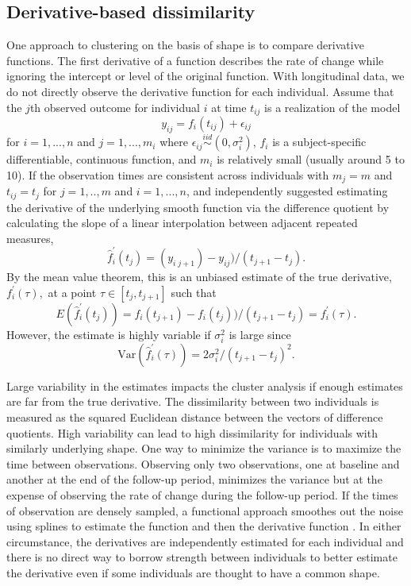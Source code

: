 \subsection{Derivative-based dissimilarity}
One approach to clustering on the basis of shape is to compare derivative functions. The first derivative of a function describes the rate of change while ignoring the intercept or level of the original function. With longitudinal data, we do not directly observe the derivative function for each individual. Assume that the $j$th observed outcome for individual $i$ at time $t_{ij}$ is a realization of the model
$$y_{ij}= f_i(t_{ij})+\epsilon_{ij}$$
for $i=1,...,n$ and $j=1,...,m_{i}$ where $\epsilon_{ij}\overset{iid}{\sim} (0,\sigma_{i}^{2})$, $f_{i}$ is a subject-specific differentiable, continuous function, and $m_{i}$ is relatively small (usually around 5 to 10). If the observation times are consistent across individuals with $m_{j}=m$ and $t_{ij} = t_{j}$ for $j=1,..,m$ and $i=1,...,n$, \Textcite{moller2003} and \textcite{d2000} independently suggested estimating the derivative of the underlying smooth function via the difference quotient by calculating the slope of a linear interpolation between adjacent repeated measures,
$$\hat{f}_{i}^{'}(t_{j}) = (y_{i\;j+1})-y_{ij})/(t_{j+1}-t_j).$$
By the mean value theorem, this is an unbiased estimate of the true derivative, $f_{i}^{'}(\tau),$ at a point $\tau\in[t_{j},t_{j+1}]$ such that
$$E(\hat{f}_{i}^{'}(t_{j})) = f_i(t_{j+1})-f_i(t_j))/(t_{j+1}-t_j) =f_{i}^{'}(\tau). $$
However, the estimate is highly variable if $\sigma_{i}^{2}$ is large since
$$\text{Var}(\hat{f}_{i}^{'}(\tau)) =  2\sigma^{2}_{i}/ (t_{j+1}-t_j)^{2}.$$

Large variability in the estimates impacts the cluster analysis if enough estimates are far from the true derivative. The dissimilarity between two individuals is measured as the squared Euclidean distance between the vectors of difference quotients. High variability can lead to high dissimilarity for individuals with similarly underlying shape. One way to minimize the variance is to maximize the time between observations. Observing only two observations, one at baseline and another at the end of the follow-up period, minimizes the variance but at the expense of observing the rate of change during the follow-up period. If the times of observation are densely sampled, a functional approach smoothes out the noise using splines to estimate the function and then the derivative function \cite{tarpey2003}. In either circumstance, the derivatives are independently estimated for each individual and there is no direct way to borrow strength between individuals to better estimate the derivative even if some individuals are thought to have a common shape.

